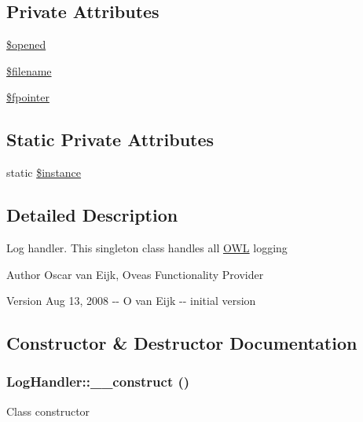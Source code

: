 \subsection*{Private Attributes}
\begin{DoxyCompactItemize}
\item 
\hyperlink{classLogHandler_a956e7e71a9ff96c6301d1f41a5bf207e}{\$opened}
\item 
\hyperlink{classLogHandler_ab51c12bcd654093b9d0153ab38ebad8c}{\$filename}
\item 
\hyperlink{classLogHandler_ad65c8954bda40d8a33828f0a0a2cbf5b}{\$fpointer}
\end{DoxyCompactItemize}
\subsection*{Static Private Attributes}
\begin{DoxyCompactItemize}
\item 
static \hyperlink{classLogHandler_a1907cf33534c0b1100fa593c12bcfb6e}{\$instance}
\end{DoxyCompactItemize}


\subsection{Detailed Description}
Log handler. This singleton class handles all \hyperlink{classOWL}{OWL} logging \begin{DoxyAuthor}{Author}
Oscar van Eijk, Oveas Functionality Provider 
\end{DoxyAuthor}
\begin{DoxyVersion}{Version}
Aug 13, 2008 -\/-\/ O van Eijk -\/-\/ initial version 
\end{DoxyVersion}


\subsection{Constructor \& Destructor Documentation}
\subsubsection[{\_\-\_\-construct}]{\setlength{\rightskip}{0pt plus 5cm}LogHandler::\_\-\_\-construct ()}\label{classLogHandler_aacca49c4394109f4ccc494048a0b2cab}
Class constructor 

